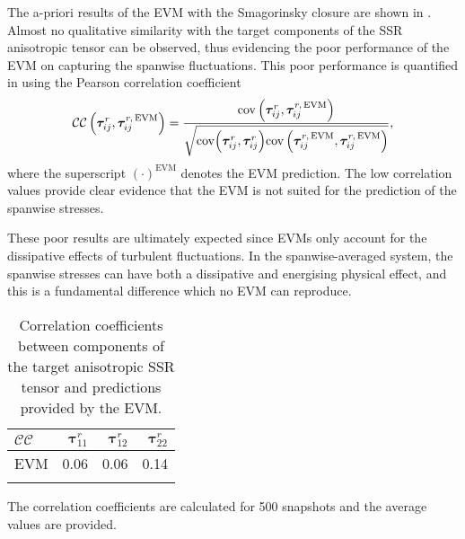 \documentclass[../main.tex]{subfiles}
\begin{document}
The a-priori results of the EVM with the Smagorinsky closure are shown in .
Almost no qualitative similarity with the target components of the SSR anisotropic tensor can be observed, thus evidencing the poor performance of the EVM on capturing the spanwise fluctuations.
This poor performance is quantified in  using the Pearson correlation coefficient
\begin{equation}
\mathcal{CC}\left(\boldsymbol\tau^r_{ij},\boldsymbol\tau^{r,\,\mathrm{EVM}}_{ij} \right)=\frac{\mathrm{cov}\left(\boldsymbol\tau^r_{ij},\boldsymbol\tau^{r,\,\mathrm{EVM}}_{ij} \right)}{\sqrt{\mathrm{cov}\Big(\boldsymbol\tau^r_{ij},\boldsymbol\tau^r_{ij}\Big)\mathrm{cov}\left(\boldsymbol\tau^{r,\,\mathrm{EVM}}_{ij},\boldsymbol\tau^{r,\,\mathrm{EVM}}_{ij} \right)}},
\end{equation}
where the superscript $(\cdot)^{\mathrm{EVM}}$ denotes the EVM prediction.
The low correlation values provide clear evidence that the EVM is not suited for the prediction of the spanwise stresses.

These poor results are ultimately expected since EVMs only account for the dissipative effects of turbulent fluctuations.
In the spanwise-averaged system, the spanwise stresses can have both a dissipative and energising physical effect, and this is a fundamental difference which no EVM can reproduce.

\begin{table}[t]
\centering
\caption{Correlation coefficients between components of the target anisotropic SSR tensor and predictions provided by the EVM.}
\begin{tabular}{lrrr}
\toprule
$\mathcal{CC}$ & $\boldsymbol\tau^r_{11}$ & $\boldsymbol\tau^r_{12}$ & $\boldsymbol\tau^r_{22}$ \\
\midrule
EVM &  0.06& 0.06 & 0.14\\
\bottomrule
\label{tab:a-priori_EVM}
\end{tabular}

{\footnotesize The correlation coefficients are calculated for 500 snapshots and the average values are provided. \par}
\end{table}
\end{document}
